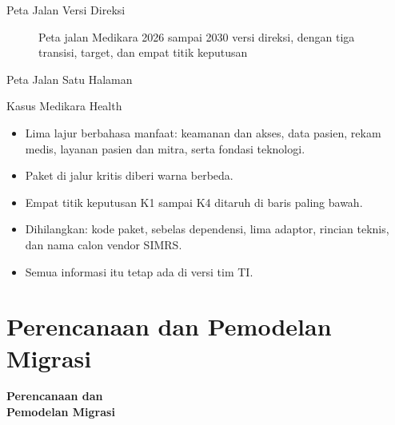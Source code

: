 \documentclass[aspectratio=169, table, 12pt]{beamer}
\begin{document}
\begin{frame}{{\Large Peta Jalan Versi Direksi}}
  \centering
  \begin{figure}
    \resizebox{0.82\textwidth}{!}{}
    \caption{Peta jalan Medikara 2026 sampai 2030 versi direksi, dengan tiga transisi, target, dan
             empat titik keputusan}
  \end{figure}
\end{frame}

\begin{frame}{{\Large Peta Jalan Satu Halaman}}
  \begin{block}{Kasus Medikara Health}
    \small
    \begin{itemize}
      \item Lima lajur berbahasa manfaat: keamanan dan akses, data pasien, rekam medis, layanan pasien
            dan mitra, serta fondasi teknologi.
      \item Paket di jalur kritis diberi warna berbeda.
      \item Empat titik keputusan K1 sampai K4 ditaruh di baris paling bawah.
      \item Dihilangkan: kode paket, sebelas dependensi, lima adaptor, rincian teknis, dan nama calon
            vendor SIMRS.
      \item Semua informasi itu tetap ada di versi tim TI.
    \end{itemize}
  \end{block}
\end{frame}

\section{Perencanaan dan Pemodelan Migrasi}

\begin{frame}{\hfill}
  \centering
  \Huge{\textbf{Perencanaan dan\\Pemodelan Migrasi}}
\end{frame}
\end{document}
